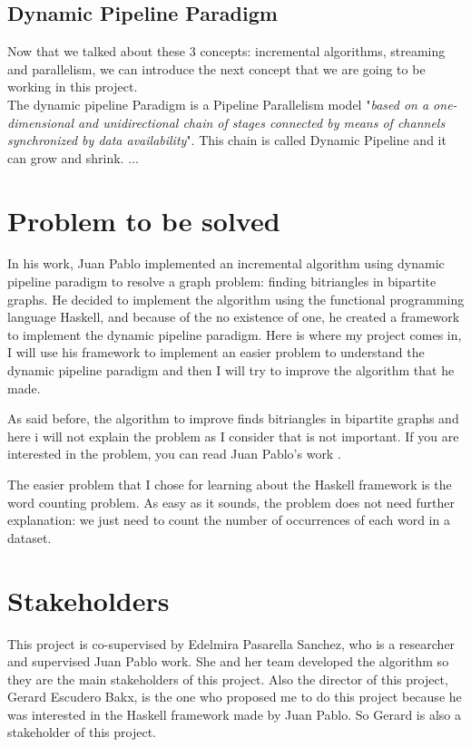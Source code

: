\subsection*{Dynamic Pipeline Paradigm}
Now that we talked about these 3 concepts: incremental algorithms, streaming and parallelism, we can introduce the next concept that we are going to be working in this project. \\
The dynamic pipeline Paradigm is a Pipeline Parallelism model "\textit{based on a one-dimensional and unidirectional chain of stages connected by means of channels synchronized by data availability}". \cite*[][Page 9, 2.2]{pasarella_facultat_nodate}
This chain is called Dynamic Pipeline and it can grow and shrink.
...
\section{Problem to be solved}
In his work, Juan Pablo implemented an incremental algorithm using dynamic pipeline paradigm to resolve a graph problem: finding bitriangles in bipartite graphs.
He decided to implement the algorithm using the functional programming language Haskell, and because of the no existence of one, he created a framework to implement the dynamic pipeline paradigm.
Here is where my project comes in, I will use his framework to implement an easier problem to understand the dynamic pipeline paradigm and then I will try to improve the algorithm that he made.

As said before, the algorithm to improve finds bitriangles in bipartite graphs and here i will not explain the problem as I consider that is not important.
If you are interested in the problem, you can read Juan Pablo's work \cite[][Page 5, 1.1]{pasarella_facultat_nodate}.

The easier problem that I chose for learning about the Haskell framework is the word counting problem.
As easy as it sounds, the problem does not need further explanation: we just need to count the number of occurrences of each word in a dataset.
\section{Stakeholders}
This project is co-supervised by Edelmira Pasarella Sanchez, who is a researcher and supervised Juan Pablo work.
She and her team developed the algorithm so they are the main stakeholders of this project.
Also the director of this project, Gerard Escudero Bakx, is the one who proposed me to do this project because he was interested in the Haskell framework made by Juan Pablo.
So Gerard is also a stakeholder of this project.

